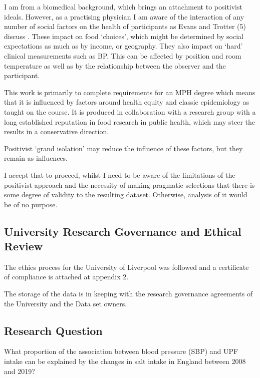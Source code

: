 \documentclass[
]{article}
\begin{document}
I am from a biomedical background, which brings an attachment to
positivist ideals. However, as a practising physician I am aware of the
interaction of any number of social factors on the health of
participants as Evans and Trotter (5) discuss . These impact on food
`choices', which might be determined by social expectations as much as
by income, or geography. They also impact on `hard' clinical
measurements such as BP. This can be affected by position and room
temperature as well as by the relationship between the observer and the
participant.

This work is primarily to complete requirements for an MPH degree which
means that it is influenced by factors around health equity and classic
epidemiology as taught on the course. It is produced in collaboration
with a research group with a long established reputation in food
research in public health, which may steer the results in a conservative
direction.

Positivist `grand isolation' may reduce the influence of these factors,
but they remain as influences.

I accept that to proceed, whilst I need to be aware of the limitations
of the positivist approach and the necessity of making pragmatic
selections that there is some degree of validity to the resulting
dataset. Otherwise, analysis of it would be of no purpose.

\hypertarget{university-research-governance-and-ethical-review}{%
\subsection{University Research Governance and Ethical
Review}\label{university-research-governance-and-ethical-review}}

The ethics process for the University of Liverpool was followed and a
certificate of compliance is attached at appendix 2.

The storage of the data is in keeping with the research governance
agreements of the University and the Data set owners.

\hypertarget{research-question}{%
\subsection{Research Question}\label{research-question}}

What proportion of the association between blood pressure (SBP) and UPF
intake can be explained by the changes in salt intake in England between
2008 and 2019?
\end{document}

